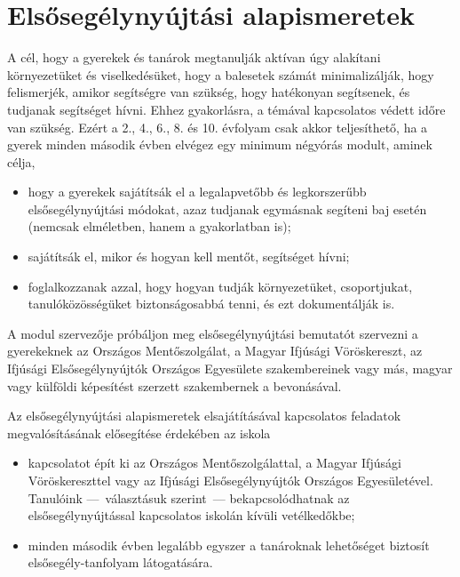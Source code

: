\hypertarget{elsosegely-nyujtasi-alapismeretek}{%
\section{Elsősegélynyújtási
alapismeretek}\label{elsosegely-nyujtasi-alapismeretek}}

A cél, hogy a gyerekek és tanárok megtanulják aktívan úgy alakítani
környezetüket és viselkedésüket, hogy a balesetek számát minimalizálják,\break
hogy felismerjék, amikor segítségre van szükség, hogy hatékonyan
segítsenek, és tudjanak segítséget hívni. Ehhez gyakorlásra, a témával
kapcsolatos védett időre van szükség. Ezért a 2., 4., 6., 8. és
10. évfolyam csak akkor teljesíthető, ha a gyerek minden második évben
elvégez egy minimum négyórás modult, aminek célja,

\begin{itemize}
\tightlist
\item
  hogy a gyerekek sajátítsák el a legalapvetőbb és legkorszerűbb
  elsősegélynyújtási módokat, azaz tudjanak egymásnak segíteni
  baj esetén (nemcsak elméletben, hanem a gyakorlatban is);
\item
  sajátítsák el, mikor és hogyan kell mentőt, segítséget hívni;
\item
  foglalkozzanak azzal, hogy hogyan tudják környezetüket, csoportjukat,
  tanulóközösségüket biztonságosabbá tenni, és ezt dokumentálják is.
\end{itemize}

A modul szervezője próbáljon meg elsősegélynyújtási bemutatót szervezni
a gyerekeknek az Országos Mentőszolgálat, a Magyar Ifjúsági Vöröskereszt,
az Ifjúsági Elsősegélynyújtók Országos Egyesülete szakembereinek vagy más,
magyar vagy külföldi képesítést szerzett szakembernek a bevonásával.

Az elsősegélynyújtási alapismeretek elsajátításával kapcsolatos
feladatok megvalósításának elősegítése érdekében az iskola

\begin{itemize}
\item
  kapcsolatot épít ki az Országos Mentőszolgálattal, a Magyar Ifjúsági
  Vöröskereszttel vagy az Ifjúsági Elsősegélynyújtók Országos
  Egyesületével. Tanulóink ---~választásuk szerint~--- bekapcsolódhatnak
  az elsősegélynyújtással kapcsolatos iskolán kívüli vetélkedőkbe;
\item
  minden második évben legalább egyszer a tanároknak lehetőséget
  biztosít elsősegély-tanfolyam látogatására.
\end{itemize}
